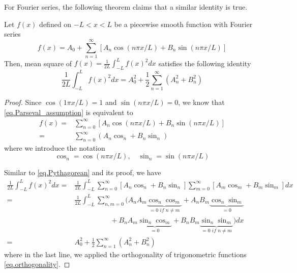 For Fourier series, the following theorem claims that a similar identity is true.

\begin{theorem}
    Let $f(x)$ defined on $-L<x<L$ be a piecewise smooth function with Fourier series 
    \begin{equation}\label{eq.Parseval_assumption}
        f(x) = A_0+\sum_{n=1}^{\infty}[A_n \cos (n \pi x / L)+B_n \sin (n \pi x / L)]
    \end{equation}
    Then, mean square of $f(x)=\frac{1}{2 L} \int_{-L}^L f(x)^2 d x$ satisfies the following identity
    \begin{equation}\label{eq.Parseval_fourier}
        \frac{1}{2 L} \int_{-L}^L f(x)^2 d x=A_0^2+\frac{1}{2} \sum_{n=1}^{\infty}\left(A_n^2+B_n^2\right)
    \end{equation}
\end{theorem}
\begin{proof}
    Since $\cos (1 \pi x / L) = 1$ and $\sin (n \pi x / L) = 0$, we know that \eqref{eq.Parseval_assumption} is equivalent to 
    \begin{equation}\label{eq.proof_Parseval_1}
        \begin{split}
            f(x) =& \sum_{n=0}^{\infty}[A_n \cos (n \pi x / L)+B_n \sin (n \pi x / L)]
            \\
            =&\sum_{n=0}^{\infty}(A_n \cos_n +B_n \sin_n)
        \end{split}
    \end{equation}
    where we introduce the notation
    \begin{equation}\label{eq.proof_Parseval_2}
        \cos_n = \cos (n \pi x / L),\quad \sin_n = \sin (n \pi x / L)
    \end{equation}

    Similar to \eqref{eq.Pythagorean} and its proof, we have 
    \begin{equation}\label{eq.proof_Parseval_3}
        \begin{split}
            \frac{1}{2 L} \int_{-L}^L f(x)^2 d x 
            =& \frac{1}{2 L} \int_{-L}^L \sum_{n=0}^{\infty}[A_n \cos_n+B_n \sin_n] \sum_{m=0}^{\infty}[A_m \cos_m+B_m \sin_m] d x
            \\
            =&\frac{1}{2 L} \int_{-L}^L \sum_{n,m=0}^{\infty}(A_nA_m \underbrace{\cos_n\cos_m}_{= 0\textit{ if }n\neq m} + A_nB_m\underbrace{\cos_n\sin_m}_{=0} 
            \\
            &\qquad\qquad\quad+ B_nA_m\underbrace{\sin_n\cos_m}_{=0} + B_nB_m\underbrace{\sin_n\sin_m}_{= 0\textit{ if }n\neq m}) d x
            \\
            =&A_0^2+\frac{1}{2} \sum_{n=1}^{\infty}\left(A_n^2+B_n^2\right)
        \end{split}
    \end{equation}
    where in the last line, we applied the orthogonality of trigonometric functions \eqref{eq.orthogonality}.
\end{proof}

